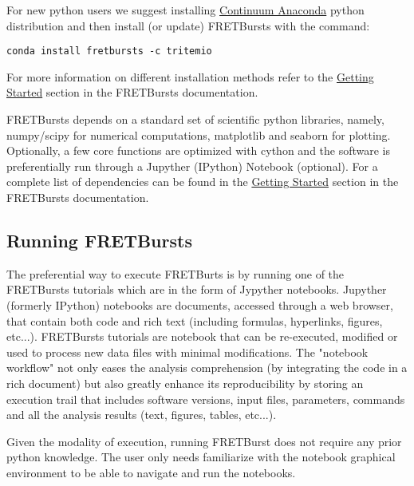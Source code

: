 For new python users we suggest installing 
\href{https://store.continuum.io/cshop/anaconda/}{Continuum Anaconda}
python distribution and then install (or update) FRETBursts with the command:

\begin{verbatim}
conda install fretbursts -c tritemio
\end{verbatim}

For more information on different installation methods refer to the 
\href{http://fretbursts.readthedocs.org/en/latest/getting_started.html}{Getting Started}
section in the FRETBursts documentation.

FRETBursts depends on a standard set of scientific 
python libraries, namely, numpy/scipy for numerical computations, 
matplotlib and seaborn for plotting. Optionally, a few core functions are
optimized with cython and the software is preferentially run through
a Jupyther (IPython) Notebook (optional).
For a complete list of dependencies can be found in the 
\href{http://fretbursts.readthedocs.org/en/latest/getting_started.html}{Getting Started}
section in the FRETBursts documentation.

\subsection{Running FRETBursts}
The preferential way to execute FRETBurts is by running one of the
FRETBursts tutorials which are in the form of Jypyther notebooks.
Jupyther (formerly IPython) notebooks are documents, 
accessed through a web browser, that contain both code and 
rich text (including formulas, hyperlinks, figures, etc...).
FRETBursts tutorials are notebook that can be re-executed,
modified or used to process new data files with minimal modifications.
The "notebook workflow"\cite{Shen_2014} not only eases 
the analysis comprehension (by integrating the code in a rich document)
but also greatly enhance its reproducibility by storing an execution trail
that includes software versions, input files, parameters, commands and all
the analysis results (text, figures, tables, etc...).

Given the modality of execution, running FRETBurst does not require
any prior python knowledge. The user only needs familiarize with the
notebook graphical environment to be able to navigate and run the notebooks.
